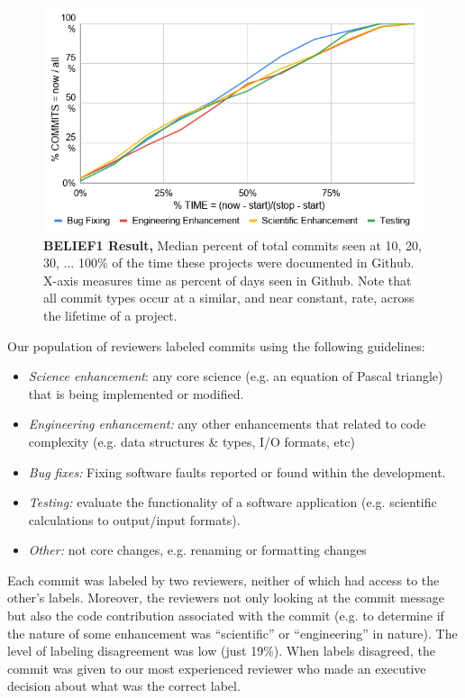 \documentclass[sigconf,review,anonymous]{acmart}
\newcommand{\bi}{\begin{itemize}}
\newcommand{\ei}{\end{itemize}}
\begin{document}
 
 \begin{figure}[!b]
\begin{center}\includegraphics[width=.6\linewidth]{img/belief1_1.png}\end{center}
\caption{{\bf BELIEF1 Result,} 
Median percent  of total commits seen
at 10, 20, 30, ... 100\% of 
the time these projects were
documented in Github.
X-axis measures time as percent of days seen in Github.
Note
that all commit types occur
at a similar, and near constant,
 rate, across the lifetime of a project.}\label{fig:belief1} 
\end{figure}

 Our population of reviewers
labeled commits using the following
guidelines:
\bi
\item {\em Science enhancement}: any core science (e.g. an equation of Pascal triangle) that is being implemented or modified.
\item {\em Engineering enhancement:} any other enhancements that related to code complexity (e.g. data structures \& types, I/O formats, etc) 
\item {\em Bug fixes:} Fixing software faults reported or found within the development. 
\item {\em Testing: } evaluate the functionality of a software application (e.g. scientific calculations to output/input formats).
\item
{\em Other:} not core changes, e.g. renaming or formatting changes
\ei
Each commit was labeled by two reviewers,
neither of which had access to the other's labels. Moreover, the reviewers not only looking at the commit message but also the code contribution associated with the commit (e.g. to determine if the nature of some enhancement was 
``scientific'' or ``engineering'' in nature). The level of
labeling disagreement was low (just 19\%). When labels disagreed, the commit was given to our most experienced reviewer who made an executive decision about what
was the correct label.

\end{document}
